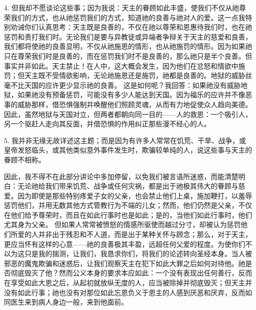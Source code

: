 4. 但我却不愿谈论这些事；因为我说：天主的眷顾如此丰盛，使我们不仅从祂尊荣我们的方式，也从祂惩罚我们的方式，知道祂的良善与祂对人的爱。这一点我特别劝诫你们认真思考：天主既是良善的，不仅在祂以尊荣和恩惠待我们时，也在祂惩罚和责打我们时。无论我们是要与异教徒或异端者争辩关于天主的慈爱和良善，我们都将使祂的良善显明，不仅从祂施恩的情形，也从祂施罚的情形。因为如果祂只在尊荣我们时是良善的，而在惩罚我们时不是良善的，那么祂只是半个良善。但事实并非如此。天主禁止！在人中，这大概会发生，因为他们在忿怒和情欲中施罚；但天主既不受情欲影响，无论祂施恩还是施罚，祂都是良善的。地狱的威胁丝毫不比天国的应许更少显示祂的良善。 这是如何呢？我回答：如果祂没有威胁地狱，如果祂没有预备惩罚，可能没有多少人能达到天国。因为福乐的应许并不像恶事的威胁那样，借恐惧强制并唤醒他们照顾灵魂，从而有力地促使众人趋向美德。因此，虽然地狱与天国对立，但两者都朝向同一目的——人的救恩：一个吸引人，另一个驱赶人走向其反面，并借恐惧的作用纠正那些漫不经心的人。\par

5. 我并非无缘无故详述这主题；而是因为有许多人常常在饥荒、干旱、战争，或皇帝发怒临头，或其他类似意外事件发生时，欺骗较单纯的人，说这些事与天主的眷顾不相称。\par

因此，我不得不在此部分讲论中多加停留，以免我们被言语所迷惑，而能清楚明白：无论祂给我们带来饥荒、战争或任何灾祸，都是出于祂极其伟大的眷顾与慈爱。因为即使是那些特别疼爱子女的父亲，也会禁止他们上桌，施加鞭打，以羞辱惩罚他们，并用无数其他方式管教行为不端的儿女；然而，他们仍然是父亲，不仅在他们给予尊荣时，而且在如此行事时也是如此；是的，当他们如此行事时，他们尤其身为父亲。 但如果人常常被愤怒的情感所驱使而越过分寸，却被认为惩罚他们所爱的人并非出于残忍和不人道，而是出于某种关怀与顾念；那么，对于天主，更应当怀有这样的心意——祂的良善极其丰盈，远超任何父爱的程度。为使你们不以为这只是我的揣测，让我们，我恳求你们，将我们的论述转向圣经本身。当人被邪恶的魔鬼欺骗和迷惑后，让我们观察天主在犯下如此大罪之后如何对待他。祂是否彻底毁灭了他？然而公义本身的要求本应如此：一个没有表现出任何善行，反而在享受如此大恩之后，从起初就放纵无度的人，应当被除掉并彻底毁灭；但天主并没有如此行事；祂也没有对那位如此忘恩负义于恩主的人感到厌恶和厌弃，反而如同医生来到病人身边一般，来到他面前。\par


